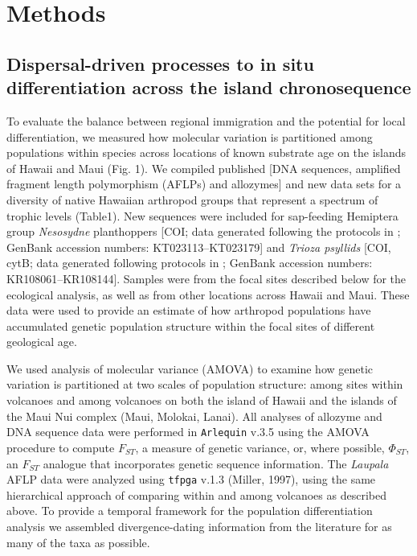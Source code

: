 \section{Methods}

\subsection{Dispersal-driven processes to in situ differentiation
across the island chronosequence}

To evaluate the balance between regional immigration and the potential
for local differentiation, we measured how molecular variation is
partitioned among populations within species across locations of known
substrate age on the islands of Hawaii and Maui (Fig. 1). We compiled
published [DNA sequences, amplified fragment length polymorphism
(AFLPs) and allozymes] and new data sets for a diversity of native
Hawaiian arthropod groups that represent a spectrum of trophic levels
(Table1). New sequences were included for sap-feeding Hemiptera group
\textit{Nesosydne} planthoppers [COI; data generated following the
protocols in \cite{goodman2012}; GenBank accession numbers:
KT023113–KT023179] and \textit{Trioza psyllids} [COI, cytB; data
generated following protocols in \cite{percy2003}; GenBank accession
numbers: KR108061–KR108144]. Samples were from the focal sites
described below for the ecological analysis, as well as from other
locations across Hawaii and Maui. These data were used to provide an
estimate of how arthropod populations have accumulated genetic
population structure within the focal sites of different geological
age.

We used analysis of molecular variance (AMOVA) to examine how genetic
variation is partitioned at two scales of population structure: among
sites within volcanoes and among volcanoes on both the island of
Hawaii and the islands of the Maui Nui complex (Maui, Molokai,
Lanai). All analyses of allozyme and DNA sequence data were performed
in \texttt{Arlequin} v.3.5 \citep{arlequin} using the AMOVA procedure
to compute $F_{ST}$, a measure of genetic variance, or, where
possible, $\Phi_{ST}$, an $F_{ST}$ analogue that incorporates genetic
sequence information. The \textit{Laupala} AFLP data were analyzed
using \texttt{tfpga} v.1.3 (Miller, 1997), using the same hierarchical
approach of comparing within and among volcanoes as described
above. To provide a temporal framework for the population
differentiation analysis we assembled divergence-dating information
from the literature for as many of the taxa as possible.

